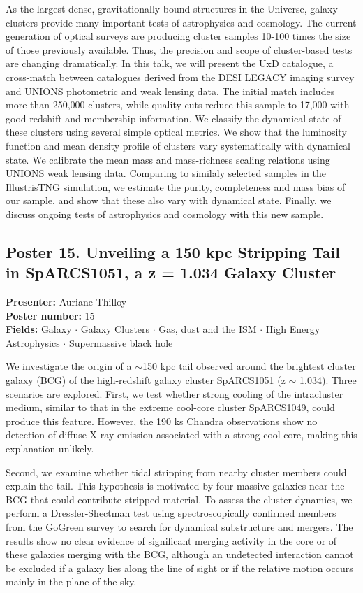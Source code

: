 As the largest dense, gravitationally bound structures in the Universe, galaxy clusters provide many important tests of astrophysics and cosmology. The current generation of optical surveys are producing cluster samples 10-100 times the size of those previously available. Thus, the precision and scope of cluster-based tests are changing dramatically. In this talk, we will present the UxD catalogue, a cross-match between catalogues derived from the DESI LEGACY imaging survey and UNIONS photometric and weak lensing data. The initial match includes more than 250,000 clusters, while quality cuts reduce this sample to 17,000 with good redshift and membership information. We classify the dynamical state of these clusters using several simple optical metrics. We show that the luminosity function and mean density profile of clusters vary systematically with dynamical state. We calibrate the mean mass and mass-richness scaling relations using UNIONS weak lensing data. Comparing to similaly selected samples in the IllustrisTNG simulation, we estimate the purity, completeness and mass bias of our sample, and show that these also vary with dynamical state. Finally, we discuss ongoing tests of astrophysics and cosmology with this new sample.

\hypertarget{poster-abstract-talk-85}{}\label{poster-abstract-page-talk-85}
\subsection*{Poster 15. Unveiling a 150 kpc Stripping Tail in SpARCS1051, a z = 1.034 Galaxy Cluster}
\textbf{Presenter:} Auriane Thilloy\\
\textbf{Poster number:} 15\\
\textbf{Fields:} Galaxy $\cdot$ Galaxy Clusters $\cdot$ Gas, dust and the ISM $\cdot$ High Energy Astrophysics $\cdot$ Supermassive black hole

We investigate the origin of a $\sim$150 kpc tail observed around the brightest cluster galaxy (BCG) of the high-redshift galaxy cluster SpARCS1051 (z $\sim$ 1.034). Three scenarios are explored. First, we test whether strong cooling of the intracluster medium, similar to that in the extreme cool-core cluster SpARCS1049, could produce this feature. However, the 190 ks Chandra observations show no detection of diffuse X-ray emission associated with a strong cool core, making this explanation unlikely.

Second, we examine whether tidal stripping from nearby cluster members could explain the tail. This hypothesis is motivated by four massive galaxies near the BCG that could contribute stripped material. To assess the cluster dynamics, we perform a Dressler-Shectman test using spectroscopically confirmed members from the GoGreen survey to search for dynamical substructure and mergers. The results show no clear evidence of significant merging activity in the core or of these galaxies merging with the BCG, although an undetected interaction cannot be excluded if a galaxy lies along the line of sight or if the relative motion occurs mainly in the plane of the sky.

